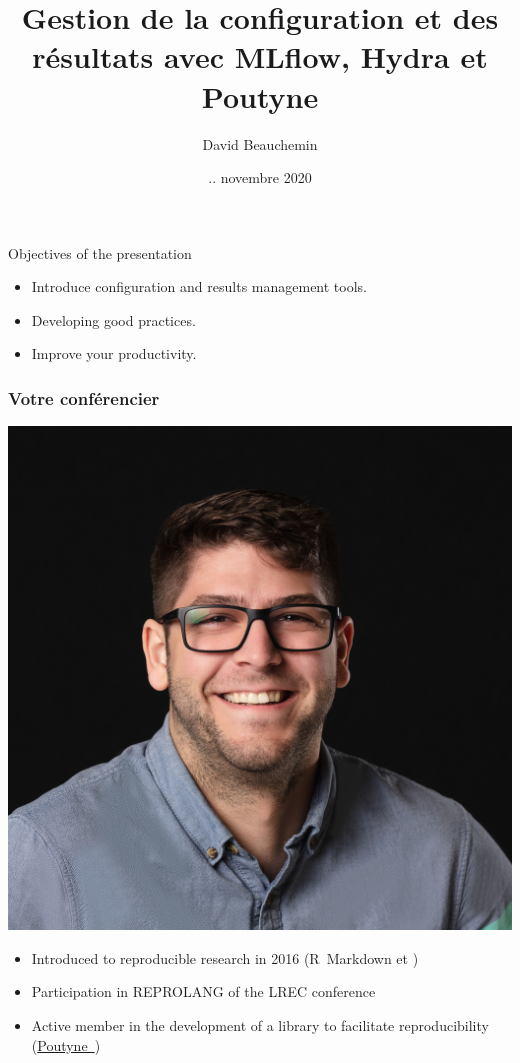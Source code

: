 \documentclass[aspectratio=169,10pt,xcolor=x11names,english,french]{beamer}
\title{Gestion de la configuration et des résultats avec MLflow, Hydra et Poutyne}
\author{David Beauchemin}
\date{.. novembre 2020}
\newcommand{\link}[2]{\href{#1}{#2~{\smaller\faExternalLink*}}}
\begin{document}
	
	
	
	
	\begin{frame}{Objectives of the presentation}
		\begin{itemize}
			\item Introduce configuration and results management tools.
			\item Developing good practices.
			\item Improve your productivity.
		\end{itemize}
	\end{frame}
	
	\begin{frame}
		\frametitle{Votre conférencier}
		
		\begin{minipage}{0.25\linewidth}
			\includegraphics[width=\linewidth,keepaspectratio]{img/david}
		\end{minipage}
		\hfill
		\begin{minipage}{0.70\linewidth}
			\begin{itemize}
				\item Introduced to reproducible research in 2016 (\mbox{R Markdown} et \faGit)
				\item Participation in REPROLANG of the LREC conference \cite{garneau2020robust}
				\item Active member in the development of a library to facilitate reproducibility (\link{https://poutyne.org/}{Poutyne})
			\end{itemize}
		\end{minipage}
		

\end{frame}
\end{document}
